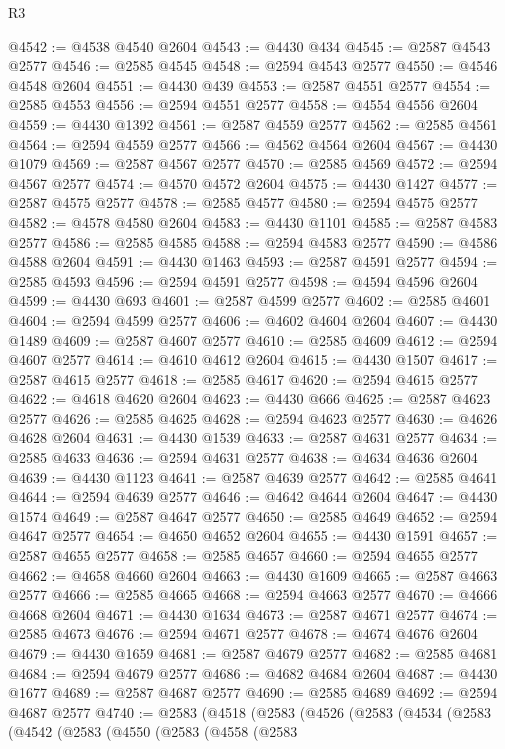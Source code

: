 \begin{lexlean}{R3}
\begin{coremodule}
@4542 := @4538 @4540 @2604
@4543 := @4430 @434
@4545 := @2587 @4543 @2577
@4546 := @2585 @4545
@4548 := @2594 @4543 @2577
@4550 := @4546 @4548 @2604
@4551 := @4430 @439
@4553 := @2587 @4551 @2577
@4554 := @2585 @4553
@4556 := @2594 @4551 @2577
@4558 := @4554 @4556 @2604
@4559 := @4430 @1392
@4561 := @2587 @4559 @2577
@4562 := @2585 @4561
@4564 := @2594 @4559 @2577
@4566 := @4562 @4564 @2604
@4567 := @4430 @1079
@4569 := @2587 @4567 @2577
@4570 := @2585 @4569
@4572 := @2594 @4567 @2577
@4574 := @4570 @4572 @2604
@4575 := @4430 @1427
@4577 := @2587 @4575 @2577
@4578 := @2585 @4577
@4580 := @2594 @4575 @2577
@4582 := @4578 @4580 @2604
@4583 := @4430 @1101
@4585 := @2587 @4583 @2577
@4586 := @2585 @4585
@4588 := @2594 @4583 @2577
@4590 := @4586 @4588 @2604
@4591 := @4430 @1463
@4593 := @2587 @4591 @2577
@4594 := @2585 @4593
@4596 := @2594 @4591 @2577
@4598 := @4594 @4596 @2604
@4599 := @4430 @693
@4601 := @2587 @4599 @2577
@4602 := @2585 @4601
@4604 := @2594 @4599 @2577
@4606 := @4602 @4604 @2604
@4607 := @4430 @1489
@4609 := @2587 @4607 @2577
@4610 := @2585 @4609
@4612 := @2594 @4607 @2577
@4614 := @4610 @4612 @2604
@4615 := @4430 @1507
@4617 := @2587 @4615 @2577
@4618 := @2585 @4617
@4620 := @2594 @4615 @2577
@4622 := @4618 @4620 @2604
@4623 := @4430 @666
@4625 := @2587 @4623 @2577
@4626 := @2585 @4625
@4628 := @2594 @4623 @2577
@4630 := @4626 @4628 @2604
@4631 := @4430 @1539
@4633 := @2587 @4631 @2577
@4634 := @2585 @4633
@4636 := @2594 @4631 @2577
@4638 := @4634 @4636 @2604
@4639 := @4430 @1123
@4641 := @2587 @4639 @2577
@4642 := @2585 @4641
@4644 := @2594 @4639 @2577
@4646 := @4642 @4644 @2604
@4647 := @4430 @1574
@4649 := @2587 @4647 @2577
@4650 := @2585 @4649
@4652 := @2594 @4647 @2577
@4654 := @4650 @4652 @2604
@4655 := @4430 @1591
@4657 := @2587 @4655 @2577
@4658 := @2585 @4657
@4660 := @2594 @4655 @2577
@4662 := @4658 @4660 @2604
@4663 := @4430 @1609
@4665 := @2587 @4663 @2577
@4666 := @2585 @4665
@4668 := @2594 @4663 @2577
@4670 := @4666 @4668 @2604
@4671 := @4430 @1634
@4673 := @2587 @4671 @2577
@4674 := @2585 @4673
@4676 := @2594 @4671 @2577
@4678 := @4674 @4676 @2604
@4679 := @4430 @1659
@4681 := @2587 @4679 @2577
@4682 := @2585 @4681
@4684 := @2594 @4679 @2577
@4686 := @4682 @4684 @2604
@4687 := @4430 @1677
@4689 := @2587 @4687 @2577
@4690 := @2585 @4689
@4692 := @2594 @4687 @2577
@4740 := @2583
    (@4518
      (@2583
        (@4526
          (@2583
            (@4534
              (@2583
                (@4542
                  (@2583
                    (@4550
                      (@2583
                        (@4558
                          (@2583

\end{coremodule}
\end{lexlean}
